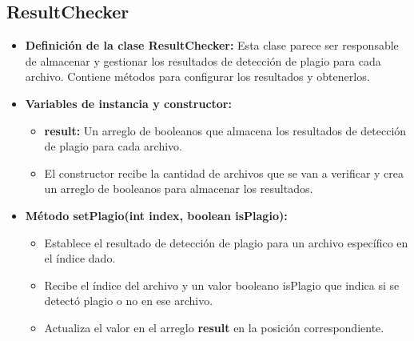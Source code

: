 \documentclass{article}
\begin{document}
	 \subsection{ResultChecker}
	\begin{itemize}
	\item \textbf{Definición de la clase ResultChecker:} Esta clase parece ser responsable de almacenar y gestionar los resultados de detección de plagio para cada archivo. Contiene métodos para configurar los resultados y obtenerlos.
	\end{itemize}	 
	
	\begin{itemize}
	\item \textbf{Variables de instancia y constructor:}
	 \begin{itemize}
	 \item \textbf{result:} Un arreglo de booleanos que almacena los resultados de detección de plagio para cada archivo. 
	 \item El constructor recibe la cantidad de archivos que se van a verificar y crea un arreglo de booleanos para almacenar los resultados.
	 \end{itemize}
	\end{itemize}
	
	\begin{itemize}
	\item \textbf{Método setPlagio(int index, boolean isPlagio):}
	 \begin{itemize}
	 \item Establece el resultado de detección de plagio para un archivo específico en el índice dado.
	 \item Recibe el índice del archivo y un valor booleano isPlagio que indica si se detectó plagio o no en ese archivo.
	 \item Actualiza el valor en el arreglo \textbf{result} en la posición correspondiente.
	 \end{itemize}
	\end{itemize}
	
\end{document}
